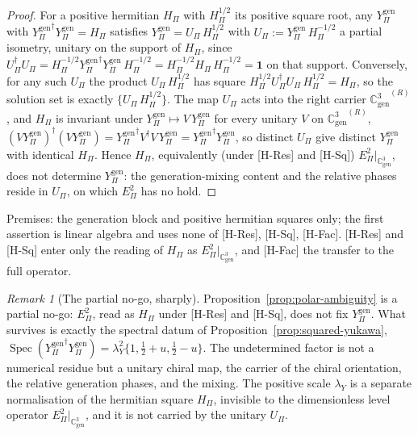 \documentclass[11pt]{article}
\theoremstyle{definition}
\theoremstyle{remark}
\newtheorem{remark}{Remark}
\newcommand{\Cgen}{\mathbb{C}^{3}_{\mathrm{gen}}}
\newcommand{\Epi}{E_{\Pi}}
\newcommand{\GR}{{\Cgen}^{(R)}}
\newcommand{\Ygen}{{Y^{\mathrm{gen}}_{\Pi}}}
\newcommand{\Hpi}{H_{\Pi}}
\newcommand{\Upi}{U_{\Pi}}
\newcommand{\lamY}{\lambda_{Y}}
\newcommand{\Spec}{\operatorname{Spec}}
\begin{document}
    \begin{proof}
      For a positive hermitian $\Hpi$ with $\Hpi^{1/2}$ its positive square root, any $\Ygen$ with
      $\Ygen^{\dagger}\Ygen = \Hpi$ satisfies $\Ygen = \Upi\,\Hpi^{1/2}$ with $\Upi := \Ygen\,\Hpi^{-1/2}$ a
      partial isometry, unitary on the support of $\Hpi$, since $\Upi^{\dagger}\Upi = \Hpi^{-1/2}
      \Ygen^{\dagger}\Ygen\,\Hpi^{-1/2} = \Hpi^{-1/2}\Hpi\,\Hpi^{-1/2} = \mathbf{1}$ on that support.
      Conversely, for any such $\Upi$ the product $\Upi\,\Hpi^{1/2}$ has square $\Hpi^{1/2}\Upi^{\dagger}
      \Upi\,\Hpi^{1/2} = \Hpi$, so the solution set is exactly $\{\Upi\,\Hpi^{1/2}\}$.
      The map $\Upi$ acts into the right carrier $\GR$, and $\Hpi$ is invariant under $\Ygen \mapsto V\,\Ygen$
      for every unitary $V$ on $\GR$, $(V\Ygen)^{\dagger}(V\Ygen) = \Ygen^{\dagger} V^{\dagger} V\,\Ygen =
      \Ygen^{\dagger}\Ygen$, so distinct $\Upi$ give distinct $\Ygen$ with identical $\Hpi$.
      Hence $\Hpi$, equivalently (under [H-Res] and [H-Sq]) $\Epi^{2}|_{\Cgen}$, does not
      determine $\Ygen$: the generation-mixing
      content and the relative phases reside in $\Upi$, on which $\Epi^{2}$ has no hold.
    \end{proof}

    Premises: the generation block and positive hermitian squares only; the first assertion is linear algebra and
    uses none of [H-Res], [H-Sq], [H-Fac].
    [H-Res] and [H-Sq] enter only the reading of $\Hpi$ as $\Epi^{2}|_{\Cgen}$, and [H-Fac] the transfer to the full
    operator.

    \begin{remark}[The partial no-go, sharply]
      \label{rem:no-go}
      Proposition~\ref{prop:polar-ambiguity} is a partial no-go: $\Epi^{2}$, read as $\Hpi$ under
      [H-Res] and [H-Sq], does not fix $\Ygen$.
      What survives is exactly the spectral datum of Proposition~\ref{prop:squared-yukawa},
      $\Spec(\Ygen^{\dagger}\Ygen) = \lamY^{2}\{1, \tfrac12 + u, \tfrac12 - u\}$.
      The undetermined factor is not a numerical residue but a unitary chiral map, the carrier of the chiral
      orientation, the relative generation phases, and the mixing.
      The positive scale $\lamY$ is a separate normalisation of the hermitian square $\Hpi$, invisible to the
      dimensionless level operator $\Epi^{2}|_{\Cgen}$, and it is not carried by the unitary $\Upi$.
    \end{remark}
\end{document}
